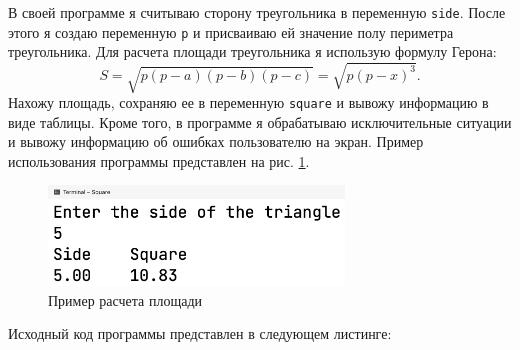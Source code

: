 \documentclass[a4paper,14pt]{extarticle}
\numberwithin{figure}{section}
\begin{document}
В своей программе я считываю сторону треугольника в переменную \texttt{side}. После этого я создаю переменную \texttt{p} и присваиваю ей значение полу периметра треугольника. Для расчета площади треугольника я использую формулу Герона:
\[
    S = \sqrt{p (p - a) (p - b) (p - c)} = \sqrt{p (p - x)^3}.
\]
Нахожу площадь, сохраняю ее в переменную \texttt{square} и вывожу информацию в виде таблицы. Кроме того, в программе я обрабатываю исключительные ситуации и вывожу информацию об ошибках пользователю на экран. Пример использования программы представлен на рис. \ref{fig:task-5}.

\begin{figure}[H]
    \centering
    \includegraphics[width=0.7\textwidth]{images/task-5.png}
    \caption{Пример расчета площади}
    \label{fig:task-5}
\end{figure}

Исходный код программы представлен в следующем листинге:
\inputminted{csharp}{../Square/Program.cs}
\end{document}
